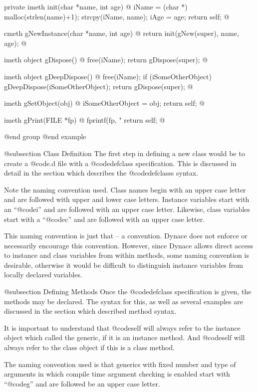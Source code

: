 private imeth init(char *name, int age)
@{
        iName = (char *) malloc(strlen(name)+1);
        strcpy(iName, name);
        iAge = age;
        return self;
@}

cmeth  gNewInstance(char *name, int age)
@{
        return init(gNew(super), name, age);
@}

imeth   object    gDispose()
@{
        free(iName);
        return gDispose(super);
@}

imeth   object   gDeepDispose()
@{
        free(iName);
        if (iSomeOtherObject)
                gDeepDispose(iSomeOtherObject);
        return gDispose(super);
@}

imeth   gSetObject(obj)
@{
        iSomeOtherObject = obj;
        return self;
@}

imeth   gPrint(FILE *fp)
@{
        fprintf(fp, "%
        return self;
@}

@end group
@end example


@subsection Class Definition
The first step in defining a new class would be to create a @code{.d}
file with a @code{defclass} specification.  This is discussed in
detail in the section which describes the @code{defclasss} syntax.

Note the naming convention used.  Class names begin with an upper case
letter and are followed with upper and lower case letters.  Instance
variables start with an ``@code{i}'' and are followed with an upper case
letter.  Likewise, class variables start with a ``@code{c}'' and are
followed with an upper case letter.

This naming convention is just that -- a convention.  Dynace does
not enforce or necessarily encourage this convention.  However,
since Dynace allows direct access to instance and class variables
from within methods, some naming convention is desirable, otherwise
it would be difficult to distinguish instance variables from locally
declared variables.

@subsection Defining Methods
Once the @code{defclass} specification is given, the methods may be
declared.  The syntax for this, as well as several examples are discussed
in the section which described method syntax.

It is important to understand that @code{self} will always refer to the
instance object which called the generic, if it is an instance method.
And @code{self} will always refer to the class object if this is a
class method.

The naming convention used is that generics with fixed number and
type of arguments in which compile time argument checking is enabled
start with ``@code{g}'' and are followed be an upper case letter.

